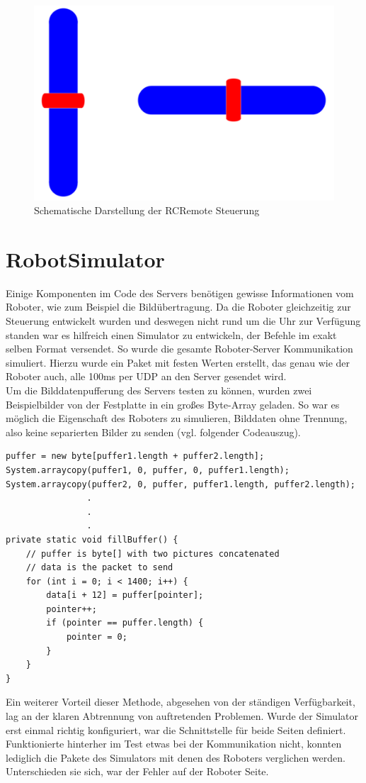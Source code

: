 \begin{figure}[h!]
	\centering
	\includegraphics[height=.25\textheight]{images/android_rcremote.pdf}
	\caption{Schematische Darstellung der RCRemote Steuerung}
	\label{fig:android_rcremote}
\end{figure}



\section{RobotSimulator}
Einige Komponenten im Code des Servers benötigen gewisse Informationen vom Roboter, wie zum Beispiel die Bildübertragung. Da die Roboter gleichzeitig zur Steuerung entwickelt wurden und deswegen nicht rund um die Uhr zur Verfügung standen war es hilfreich einen Simulator zu entwickeln, der Befehle im exakt selben Format versendet. So wurde die gesamte Roboter-Server Kommunikation simuliert. Hierzu wurde ein Paket mit festen Werten erstellt, das genau wie der Roboter auch, alle 100ms per UDP an den Server gesendet wird.\\
Um die Bilddatenpufferung des Servers testen zu können, wurden zwei Beispielbilder von der Festplatte in ein großes Byte-Array geladen. So war es möglich die Eigenschaft des Roboters zu simulieren, Bilddaten ohne Trennung, also keine separierten Bilder zu senden (vgl. folgender Codeauszug). \\

\begin{lstlisting}
puffer = new byte[puffer1.length + puffer2.length];
System.arraycopy(puffer1, 0, puffer, 0, puffer1.length);
System.arraycopy(puffer2, 0, puffer, puffer1.length, puffer2.length);
				.
				.
				.
private static void fillBuffer() {
	// puffer is byte[] with two pictures concatenated
	// data is the packet to send
	for (int i = 0; i < 1400; i++) {
		data[i + 12] = puffer[pointer];
		pointer++;
		if (pointer == puffer.length) {
			pointer = 0;
		}
	}
}
\end{lstlisting}

Ein weiterer Vorteil dieser Methode, abgesehen von der ständigen Verfügbarkeit, lag an der klaren Abtrennung von auftretenden Problemen. Wurde der Simulator erst einmal richtig konfiguriert, war die Schnittstelle für beide Seiten definiert. Funktionierte hinterher im Test etwas bei der Kommunikation nicht, konnten lediglich die Pakete des Simulators mit denen des Roboters verglichen werden. Unterschieden sie sich, war der Fehler auf der Roboter Seite.
